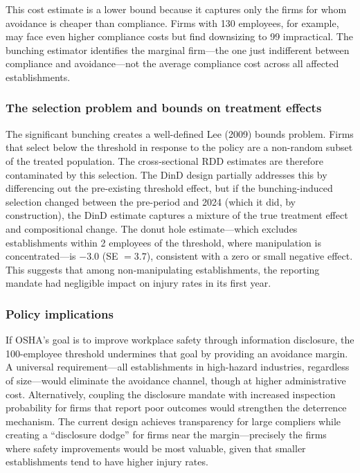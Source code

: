 \documentclass[12pt]{article}
\begin{document}
This cost estimate is a lower bound because it captures only the firms for whom avoidance is cheaper than compliance. Firms with 130 employees, for example, may face even higher compliance costs but find downsizing to 99 impractical. The bunching estimator identifies the marginal firm---the one just indifferent between compliance and avoidance---not the average compliance cost across all affected establishments.

\subsubsection*{The selection problem and bounds on treatment effects} The significant bunching creates a well-defined Lee (2009) bounds problem. Firms that select below the threshold in response to the policy are a non-random subset of the treated population. The cross-sectional RDD estimates are therefore contaminated by this selection. The DinD design partially addresses this by differencing out the pre-existing threshold effect, but if the bunching-induced selection changed between the pre-period and 2024 (which it did, by construction), the DinD estimate captures a mixture of the true treatment effect and compositional change. The donut hole estimate---which excludes establishments within 2 employees of the threshold, where manipulation is concentrated---is $-3.0$ (SE $= 3.7$), consistent with a zero or small negative effect. This suggests that among non-manipulating establishments, the reporting mandate had negligible impact on injury rates in its first year.

\subsubsection*{Policy implications} If OSHA's goal is to improve workplace safety through information disclosure, the 100-employee threshold undermines that goal by providing an avoidance margin. A universal requirement---all establishments in high-hazard industries, regardless of size---would eliminate the avoidance channel, though at higher administrative cost. Alternatively, coupling the disclosure mandate with increased inspection probability for firms that report poor outcomes would strengthen the deterrence mechanism. The current design achieves transparency for large compliers while creating a ``disclosure dodge'' for firms near the margin---precisely the firms where safety improvements would be most valuable, given that smaller establishments tend to have higher injury rates.
\end{document}
